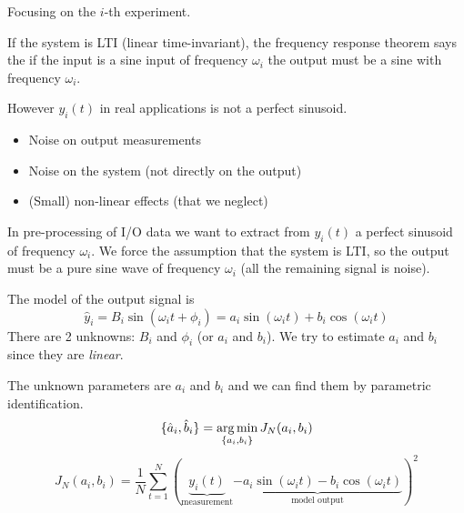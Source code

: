 Focusing on the $i$-th experiment.
\begin{figure}[H]
    \centering
\end{figure}

\begin{remark}
    If the system is LTI (linear time-invariant), the frequency response theorem says the if the input is a sine input of frequency $\omega_i$ the output must be a sine with frequency $\omega_i$.
\end{remark}

However $y_i(t)$ in real applications is not a perfect sinusoid.
\begin{itemize}
    \item Noise on output measurements
    \item Noise on the system (not directly on the output)
    \item (Small) non-linear effects (that we neglect)
\end{itemize}

In pre-processing of I/O data we want to extract from $y_i(t)$ a perfect sinusoid of frequency $\omega_i$.
We force the assumption that the system is LTI, so the output must be a pure sine wave of frequency $\omega_i$ (all the remaining signal is noise).

The model of the output signal is
\[ \hat{y}_i = B_i \sin(\omega_it+\phi_i) = a_i\sin(\omega_it) + b_i\cos(\omega_it) \]
There are 2 unknowns: $B_i$ and $\phi_i$ (or $a_i$ and $b_i$).
We try to estimate $a_i$ and $b_i$ since they are \emph{linear}.

The unknown parameters are $a_i$ and $b_i$ and we can find them by parametric identification.
\[ \{ \hat{a}_i, \hat{b}_i \} = \operatorname*{arg\,min}_{\{a_i, b_i\}} J_N(a_i, b_i) \]
\[ J_N(a_i, b_i) = \frac{1}{N} \sum_{t=1}^N ( \underbrace{y_i(t)}_{\text{measurement}} \underbrace{- a_i\sin(\omega_it) - b_i\cos(\omega_it)}_\text{model output})^2 \]

